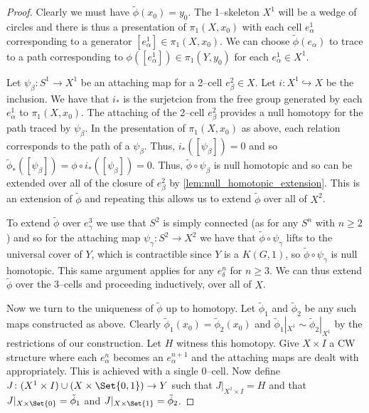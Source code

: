 \documentclass[class=article, crop=false]{standalone}
\begin{document}
\begin{proof}
    Clearly we must have $\tilde{\phi}(x_0) = y_0$. The 1--skeleton $X^1$ will be a wedge of circles and there is thus a presentation of $\pi_1(X, x_0)$ with each cell $e_\alpha^1$ corresponding to a generator $ [e_\alpha^1] \in \pi_1(X, x_0)$. We can choose $\tilde{\phi}(e_\alpha)$ to trace to a path corresponding to $\phi([e_\alpha^1]) \in \pi_1(Y,y_0)$ for each $e_\alpha^1 \in X^1$.
    
    Let $\psi_\beta \colon S^1 \to X^1$ be an attaching map for a 2--cell $e_\beta^2 \in X$. Let $i \colon X^1 \hookrightarrow X$ be the inclusion. We have that $i_*$ is the surjetcion from the free group generated by each $e_\alpha^1$ to $\pi_1(X,x_0)$. The attaching of the 2--cell $e_\beta^2$ provides a null homotopy for the path traced by $\psi_\beta$. In the presentation of $\pi_1(X, x_0)$ as above, each relation corresponds to the path of a $\psi_\beta$. Thus, $i_*([\psi_\beta]) = 0$ and so $\tilde{\phi}_*([\psi_\beta]) = \phi \circ i_*([\psi_\beta]) = 0$. Thus, $\tilde{\phi} \circ \psi_\beta$ is null homotopic and so can be extended over all of the closure of $e_\beta^2$ by \cref{lem:null_homotopic_extension}. This is an extension of $\tilde{\phi}$ and repeating this allows us to extend $\tilde{\phi}$ over all of $X^2$.
    
    To extend $\tilde{\phi}$ over $e_\gamma^3$ we use that $S^{2}$ is simply connected (as for any $S^n$ with $n\geq 2$) and so for the attaching map $\psi_\gamma \colon S^2 \to X^2$ we have that $\tilde{\phi} \circ \psi_\gamma$ lifts to the universal cover of $Y$, which is contractible since $Y$ is a $K(G,1)$, so $\tilde{\phi} \circ \psi_\gamma$ is null homotopic. This same argument applies for any $e_\delta^n$ for $n\geq 3$. We can thus extend $\tilde{\phi}$ over the 3--cells and proceeding inductively, over all of $X$.

    Now we turn to the uniqueness of $\tilde{\phi}$ up to homotopy. Let $\tilde{\phi}_1$ and $\tilde{\phi}_2$ be any such maps constructed as above. Clearly $\tilde{\phi}_1(x_0) = \tilde{\phi}_2(x_0)$ and $\tilde{\phi}_1|_{X^1} \sim \tilde{\phi}_2|_{X^1}$ by the restrictions of our construction. Let $H$ witness this homotopy. Give $X \times I$ a CW structure where each $e_\alpha^n$ becomes an $e_\alpha^{n+1}$ and the attaching maps are dealt with appropriately. This is achieved with a single 0--cell. Now define $J \colon (X^1 \times I) \cup (X \times \Set {0,1}) \to Y$ such that $J|_{X^1 \times I} = H$ and that $J|_{X \times \Set{0}} = \tilde{\phi}_1$ and $J|_{X \times \Set{1}} = \tilde{\phi}_2$.
\end{proof}
\end{document}
